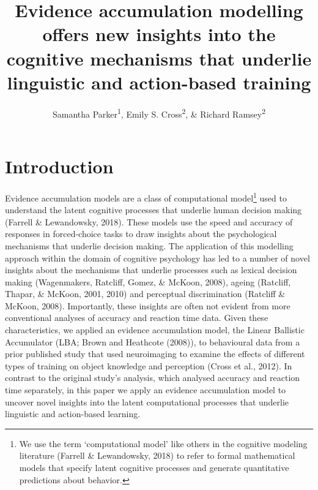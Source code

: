 \documentclass[
  english,
  man, donotrepeattitle,floatsintext]{apa6}
\title{Evidence accumulation modelling offers new insights into the cognitive mechanisms that underlie linguistic and action-based training}
\author{Samantha Parker\textsuperscript{1}, Emily S. Cross\textsuperscript{2}, \& Richard Ramsey\textsuperscript{2}}
\date{}
\affiliation{\vspace{0.5cm}\textsuperscript{1} Macquarie University\\\textsuperscript{2} ETH Zürich}
\begin{document}
\maketitle

\section{Introduction}\label{introduction}

Evidence accumulation models are a class of computational model\footnote{We use the term `computational model' like others in the cognitive modeling literature (Farrell \& Lewandowsky, 2018) to refer to formal mathematical models that specify latent cognitive processes and generate quantitative predictions about behavior.} used to understand the latent cognitive processes that underlie human decision making (Farrell \& Lewandowsky, 2018). These models use the speed and accuracy of responses in forced-choice tasks to draw insights about the psychological mechanisms that underlie decision making. The application of this modelling approach within the domain of cognitive psychology has led to a number of novel insights about the mechanisms that underlie processes such as lexical decision making (Wagenmakers, Ratcliff, Gomez, \& McKoon, 2008), ageing (Ratcliff, Thapar, \& McKoon, 2001, 2010) and perceptual discrimination (Ratcliff \& McKoon, 2008). Importantly, these insights are often not evident from more conventional analyses of accuracy and reaction time data. Given these characteristics, we applied an evidence accumulation model, the Linear Ballistic Accumulator (LBA; Brown and Heathcote (2008)), to behavioural data from a prior published study that used neuroimaging to examine the effects of different types of training on object knowledge and perception (Cross et al., 2012). In contrast to the original study's analysis, which analysed accuracy and reaction time separately, in this paper we apply an evidence accumulation model to uncover novel insights into the latent computational processes that underlie linguistic and action-based learning.
\end{document}
